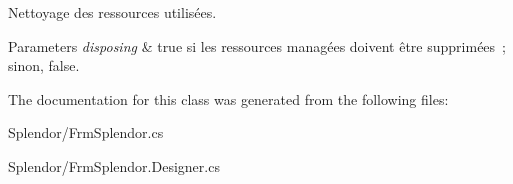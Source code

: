 Nettoyage des ressources utilisées. 


\begin{DoxyParams}{Parameters}
{\em disposing} & true si les ressources managées doivent être supprimées ; sinon, false.\\
\hline
\end{DoxyParams}


The documentation for this class was generated from the following files\+:\begin{DoxyCompactItemize}
\item 
Splendor/Frm\+Splendor.\+cs\item 
Splendor/Frm\+Splendor.\+Designer.\+cs\end{DoxyCompactItemize}
